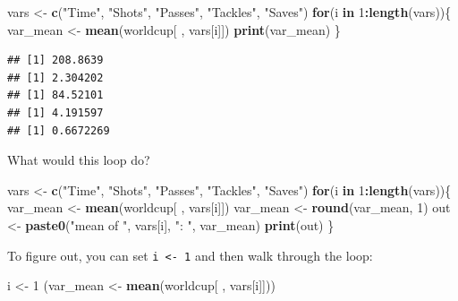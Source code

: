\documentclass[]{book}
\makeatletter
\newenvironment{Shaded}{\begin{snugshade}}{\end{snugshade}}
\newcommand{\KeywordTok}[1]{\textcolor[rgb]{0.13,0.29,0.53}{\textbf{#1}}}
\newcommand{\DecValTok}[1]{\textcolor[rgb]{0.00,0.00,0.81}{#1}}
\newcommand{\StringTok}[1]{\textcolor[rgb]{0.31,0.60,0.02}{#1}}
\newcommand{\ControlFlowTok}[1]{\textcolor[rgb]{0.13,0.29,0.53}{\textbf{#1}}}
\newcommand{\OperatorTok}[1]{\textcolor[rgb]{0.81,0.36,0.00}{\textbf{#1}}}
\newcommand{\NormalTok}[1]{#1}
\newenvironment{kframe}{%
\medskip{}
\setlength{\fboxsep}{.8em}
 \def\at@end@of@kframe{}%
 \ifinner\ifhmode%
  \def\at@end@of@kframe{\end{minipage}}%
  \begin{minipage}{\columnwidth}%
 \fi\fi%
 \def\FrameCommand##1{\hskip\@totalleftmargin \hskip-\fboxsep
 \colorbox{shadecolor}{##1}\hskip-\fboxsep
     \hskip-\linewidth \hskip-\@totalleftmargin \hskip\columnwidth}%
 \MakeFramed {\advance\hsize-\width
   \@totalleftmargin\z@ \linewidth\hsize
   \@setminipage}}%
 {\par\unskip\endMakeFramed%
 \at@end@of@kframe}
\renewenvironment{Shaded}{\begin{kframe}}{\end{kframe}}
\theoremstyle{definition}
\theoremstyle{definition}
\theoremstyle{definition}
\theoremstyle{remark}
\makeatother
\begin{document}
\begin{Shaded}
\begin{Highlighting}[]
\NormalTok{vars <-}\StringTok{ }\KeywordTok{c}\NormalTok{(}\StringTok{"Time"}\NormalTok{, }\StringTok{"Shots"}\NormalTok{, }\StringTok{"Passes"}\NormalTok{, }\StringTok{"Tackles"}\NormalTok{, }\StringTok{"Saves"}\NormalTok{)}
\ControlFlowTok{for}\NormalTok{(i }\ControlFlowTok{in} \DecValTok{1}\OperatorTok{:}\KeywordTok{length}\NormalTok{(vars))\{}
\NormalTok{        var_mean <-}\StringTok{ }\KeywordTok{mean}\NormalTok{(worldcup[ , vars[i]])}
        \KeywordTok{print}\NormalTok{(var_mean)}
\NormalTok{\}}
\end{Highlighting}
\end{Shaded}

\begin{verbatim}
## [1] 208.8639
## [1] 2.304202
## [1] 84.52101
## [1] 4.191597
## [1] 0.6672269
\end{verbatim}

What would this loop do?

\begin{Shaded}
\begin{Highlighting}[]
\NormalTok{vars <-}\StringTok{ }\KeywordTok{c}\NormalTok{(}\StringTok{"Time"}\NormalTok{, }\StringTok{"Shots"}\NormalTok{, }\StringTok{"Passes"}\NormalTok{, }\StringTok{"Tackles"}\NormalTok{, }\StringTok{"Saves"}\NormalTok{)}
\ControlFlowTok{for}\NormalTok{(i }\ControlFlowTok{in} \DecValTok{1}\OperatorTok{:}\KeywordTok{length}\NormalTok{(vars))\{}
\NormalTok{        var_mean <-}\StringTok{ }\KeywordTok{mean}\NormalTok{(worldcup[ , vars[i]])}
\NormalTok{        var_mean <-}\StringTok{ }\KeywordTok{round}\NormalTok{(var_mean, }\DecValTok{1}\NormalTok{)}
\NormalTok{        out <-}\StringTok{ }\KeywordTok{paste0}\NormalTok{(}\StringTok{"mean of "}\NormalTok{, vars[i], }\StringTok{": "}\NormalTok{, var_mean)}
        \KeywordTok{print}\NormalTok{(out)}
\NormalTok{\}}
\end{Highlighting}
\end{Shaded}

To figure out, you can set \texttt{i\ \textless{}-\ 1} and then walk
through the loop:

\begin{Shaded}
\begin{Highlighting}[]
\NormalTok{i <-}\StringTok{ }\DecValTok{1}
\NormalTok{(var_mean <-}\StringTok{ }\KeywordTok{mean}\NormalTok{(worldcup[ , vars[i]]))}
\end{Highlighting}
\end{Shaded}
\end{document}
